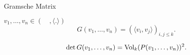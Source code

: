 \documentclass[class=article, crop=false]{standalone}
\begin{document}
\begin{zettel}{Gramsche Matrix}
\begin{flashcard}
    \begin{definition}

        $v_1,\dots,v_n \in  (\quad, \langle .\rangle)$ 
\[
    G (v_1,\dots,v_n) = ( \langle v_i,v_j\rangle)_{i,j\leq k}
.\]

\end{definition}

\end{flashcard}

\begin{theorem}
\[
\det G (v_1,\dots,v_n) = \operatorname{Vol}_k(P(v_1,\dots,v_n))^2
.\]
\end{theorem}
\end{zettel}
\end{document}
